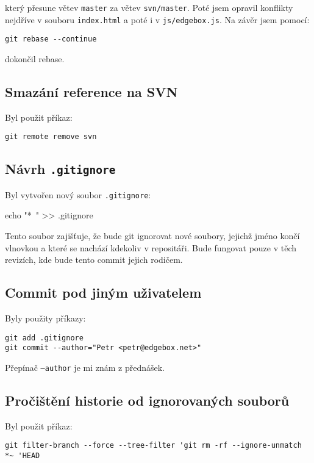 \documentclass[titlepage]{article}
\begin{document}
který přesune větev \texttt{master} za větev \texttt{svn/master}.
Poté jsem opravil konflikty nejdříve v souboru \texttt{index.html} a poté i v \texttt{js/edgebox.js}.
Na závěr jsem pomocí:

\begin{verbatim}
git rebase --continue
\end{verbatim}

dokončil rebase.

\subsection{Smazání reference na SVN}
Byl použit příkaz:
\begin{verbatim}
git remote remove svn
\end{verbatim}

\subsection{Návrh \texttt{.gitignore}}
Byl vytvořen nový soubor \texttt{.gitignore}:

\begin{verbatim*}
echo "*~" >> .gitignore
\end{verbatim*}

Tento soubor zajišťuje, že bude git ignorovat nové soubory, jejichž jméno končí vlnovkou a které se nachází kdekoliv v repositáři.
Bude fungovat pouze v těch revizích, kde bude tento commit jejich rodičem.

\subsection{Commit pod jiným uživatelem}
Byly použity příkazy:

\begin{verbatim}
git add .gitignore
git commit --author="Petr <petr@edgebox.net>"
\end{verbatim}

Přepínač \texttt{--author} je mi znám z přednášek.

\subsection{Pročištění historie od ignorovaných souborů}
Byl použit příkaz:

\begin{verbatim}
git filter-branch --force --tree-filter 'git rm -rf --ignore-unmatch *~ 'HEAD
\end{verbatim}
\end{document}
